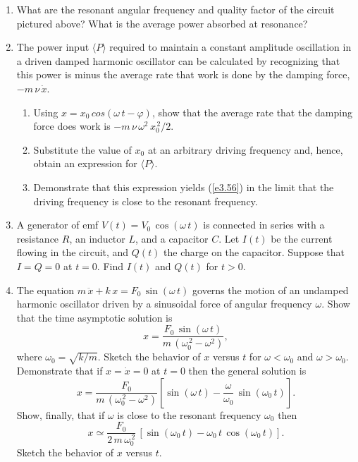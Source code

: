 {\begin{enumerate}
\begin{figure}[h]
\epsfysize=1.6in
\centerline{}
\end{figure}

\item What are the resonant angular frequency and
quality factor of the circuit pictured above? What is the average power absorbed at resonance?

\item The power input $\langle P\rangle$ required to maintain a constant amplitude oscillation in a driven
damped harmonic oscillator can be calculated by recognizing that this power is minus the average rate that work is done by the damping force, $-m\,\nu\,\dot{x}$.
\begin{enumerate}
\item Using $x = x_0\,cos(\omega\,t - \varphi)$, show that the average rate that the damping  force does work is $-m\,\nu\,\omega^2\,x_0^{\,2}/2$.

\item Substitute the value of $x_0$ at an arbitrary driving frequency and, hence, obtain an expression for $\langle P\rangle$.

\item Demonstrate that this expression yields (\ref{e3.56}) in the limit that the driving
frequency is close to the resonant frequency.
\end{enumerate}

\item A generator of emf $V(t)= V_0\, \cos(\omega\,t)$ is connected in series with a resistance $R$, an inductor $L$, and a capacitor $C$. Let $I(t)$ be the current flowing
in the circuit, and $Q(t)$ the charge on the capacitor. Suppose that $I=Q=0$ at
$t=0$. Find $I(t)$ and $Q(t)$ for $t>0$.

\item The equation $m\,\ddot{x}  + k\,x = F_0\,\sin(\omega\,t)$
governs the motion of an undamped harmonic oscillator driven by a sinusoidal
force of angular frequency $\omega$. Show that the time asymptotic solution is
$$
x = \frac{F_0\,\sin(\omega\,t)}{m\,(\omega_0^{\,2}-\omega^2)},
$$
where $\omega_0=\sqrt{k/m}$. Sketch the behavior of $x$ versus $t$ for
$\omega<\omega_0$ and $\omega>\omega_0$. Demonstrate that if $x=\dot{x}=0$ at $t=0$ then the
general solution is
$$
x =\frac{ F_0}{m\,(\omega_0^{\,2}-\omega^2)}\left[\sin(\omega\,t)-\frac{\omega}{\omega_0}\,\sin(\omega_0\,t)\right].
$$
Show, finally, that if $\omega$ is close to the resonant frequency $\omega_0$ then
$$
x\simeq \frac{F_0}{2\,m\,\omega_0^{\,2}}\,\left[\sin(\omega_0\,t)-\omega_0\,t\,\cos(\omega_0\,t)\right].
$$
Sketch the behavior of $x$ versus $t$. 
\end{enumerate}}
